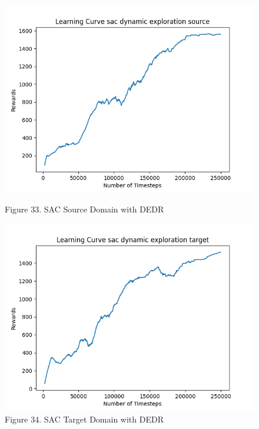 \documentclass[12pt]{article}
\begin{document}
\begin{figure}[H]
    \centering
    \begin{minipage}{0.45\textwidth}
        \centering
        \includegraphics[width=\textwidth]{../images/Learning_Curve_SAC_DE_Source.png}
        \caption{Figure 33. SAC Source Domain with DEDR}
        \label{fig:sac_source_dedr}
    \end{minipage}
    \hfill
    \begin{minipage}{0.45\textwidth}
        \centering
        \includegraphics[width=\textwidth]{../images/Learning_Curve_SAC_DE_Target.png}
        \caption{Figure 34. SAC Target Domain with DEDR}
        \label{fig:sac_target_dedr}
    \end{minipage}

\end{figure}
\end{document}
